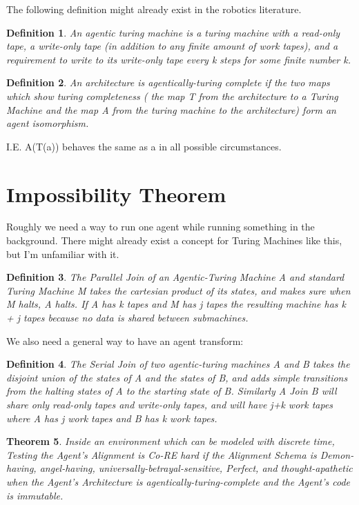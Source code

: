 \documentclass[12pt]{article}
\newtheorem{thm}{Theorem}[section]
\newtheorem{mydef}[thm]{Definition}
\begin{document}
The following definition might already exist in the robotics literature.
\begin{mydef}An agentic turing machine is a turing machine with a read-only tape, a write-only tape (in addition to any finite amount of work tapes), and a requirement to write to its write-only tape every k steps for some finite number k. \end{mydef}

\begin{mydef}An architecture is agentically-turing complete if the two maps which show turing completeness ( the map T from the architecture to a Turing Machine and the map A from the turing machine to the architecture) form an agent isomorphism. \end{mydef}
I.E. A(T(a)) behaves the same as a in all possible circumstances.
\section{Impossibility Theorem}
Roughly we need a way to run one agent while running something in the background. There might already exist a concept for Turing Machines like this, but I'm unfamiliar with it.
\begin{mydef}The Parallel Join of an Agentic-Turing Machine A and standard Turing Machine M takes the cartesian product of its states, and makes sure when M halts, A halts. If A has k tapes and M has j tapes the resulting machine has k + j tapes because no data is shared between submachines.\end{mydef}
We also need a general way to have an agent transform:
\begin{mydef} The Serial Join of two agentic-turing machines A and B takes the disjoint union of the states of A and the states of B, and adds simple transitions from the halting states of A to the starting state of B. Similarly A Join B will share only read-only tapes and write-only tapes, and will have j+k work tapes where A has j work tapes and B has k work tapes.\end{mydef}
\begin{thm}Inside an environment which can be modeled with discrete time, Testing the Agent's Alignment is Co-RE hard if the Alignment Schema is Demon-having, angel-having, universally-betrayal-sensitive, Perfect, and thought-apathetic when the Agent's
Architecture is agentically-turing-complete and the Agent's code is immutable.\end{thm}
\end{document}
